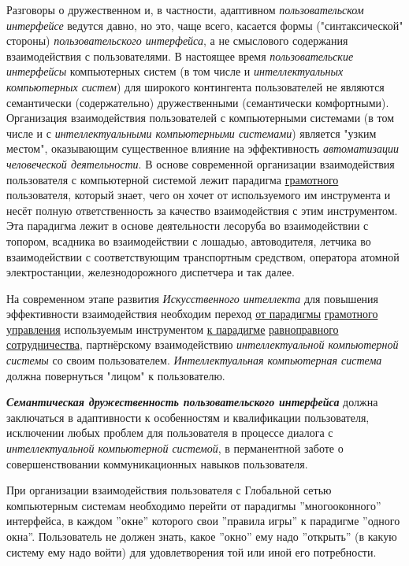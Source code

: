 Разговоры о дружественном и, в частности, адаптивном \textit{пользовательском интерфейсе} ведутся давно, но это, чаще всего, касается формы ("синтаксической" стороны) \textit{пользовательского интерфейса}, а не смыслового содержания взаимодействия с пользователями. В настоящее время \textit{пользовательские интерфейсы} компьютерных систем (в том числе и \textit{интеллектуальных компьютерных систем}) для широкого контингента пользователей не являются семантически (содержательно) дружественными (семантически комфортными). Организация взаимодействия пользователей с компьютерными системами (в том числе и с \textit{интеллектуальными компьютерными системами}) является "узким местом"{}, оказывающим существенное влияние на эффективность \textit{автоматизации человеческой деятельности}. В основе современной организации взаимодействия пользователя с компьютерной системой лежит парадигма \underline{грамотного} пользователя, который знает, чего он хочет от используемого им инструмента и несёт полную ответственность за качество взаимодействия с этим инструментом. Эта парадигма лежит в основе деятельности лесоруба во взаимодействии с топором, всадника во взаимодействии с лошадью, автоводителя, летчика во взаимодействии с соответствующим транспортным средством, оператора атомной электростанции, железнодорожного диспетчера и так далее.

На современном этапе развития \textit{Искусственного интеллекта} для повышения эффективности взаимодействия необходим переход \underline{от парадигмы} \underline{грамотного} \underline{управления} используемым инструментом \underline{к парадигме} \underline{равноправного} \underline{сотрудничества}, партнёрскому взаимодействию \textit{интеллектуальной компьютерной системы} со своим пользователем. \textit{Интеллектуальная компьютерная система} должна повернуться "лицом"{} к пользователю.

\textbf{\textit{Семантическая дружественность пользовательского интерфейса}} должна заключаться в адаптивности к особенностям и квалификации пользователя, исключении любых проблем для пользователя в процессе диалога с \textit{интеллектуальной компьютерной системой}, в перманентной заботе о совершенствовании коммуникационных навыков пользователя.

При организации взаимодействия пользователя с Глобальной сетью компьютерным системам необходимо перейти от парадигмы ''многооконного'' интерфейса, в каждом ''окне'' которого свои ''правила игры'' к парадигме ''одного окна''. Пользователь не должен знать, какое ''окно'' ему надо ''открыть'' (в какую систему ему надо войти) для удовлетворения той или иной его потребности.

